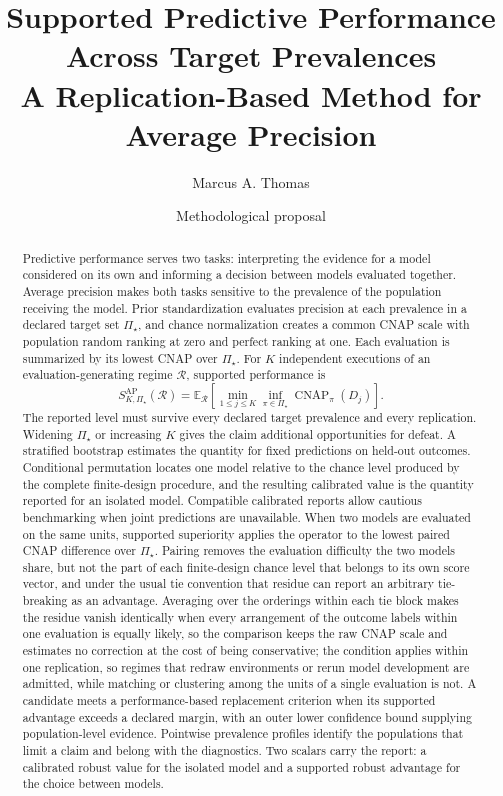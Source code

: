 \documentclass[11pt]{article}
\title{Supported Predictive Performance Across Target Prevalences\\
\large A Replication-Based Method for Average Precision}
\author{Marcus A. Thomas}
\date{Methodological proposal}
\newcommand{\CNAP}{\operatorname{CNAP}}
\newcommand{\Regime}{\mathcal{R}}
\newcommand{\PSet}{\Pi_\star}
\newcommand{\E}{\mathbb{E}}
\theoremstyle{remark}
\begin{document}
\maketitle

\begin{abstract}
Predictive performance serves two tasks: interpreting the evidence for a model considered on its own and informing a decision between models evaluated together. Average precision makes both tasks sensitive to the prevalence of the population receiving the model. Prior standardization evaluates precision at each prevalence in a declared target set $\PSet$, and chance normalization creates a common CNAP scale with population random ranking at zero and perfect ranking at one. Each evaluation is summarized by its lowest CNAP over $\PSet$. For $K$ independent executions of an evaluation-generating regime $\Regime$, supported performance is
\[
S_{K,\PSet}^{\mathrm{AP}}(\Regime)
=
\E_{\Regime}
\left[
\min_{1\leq j\leq K}
\inf_{\pi\in\PSet}\CNAP_\pi(D_j)
\right].
\]
The reported level must survive every declared target prevalence and every replication. Widening $\PSet$ or increasing $K$ gives the claim additional opportunities for defeat. A stratified bootstrap estimates the quantity for fixed predictions on held-out outcomes. Conditional permutation locates one model relative to the chance level produced by the complete finite-design procedure, and the resulting calibrated value is the quantity reported for an isolated model. Compatible calibrated reports allow cautious benchmarking when joint predictions are unavailable. When two models are evaluated on the same units, supported superiority applies the operator to the lowest paired CNAP difference over $\PSet$. Pairing removes the evaluation difficulty the two models share, but not the part of each finite-design chance level that belongs to its own score vector, and under the usual tie convention that residue can report an arbitrary tie-breaking as an advantage. Averaging over the orderings within each tie block makes the residue vanish identically when every arrangement of the outcome labels within one evaluation is equally likely, so the comparison keeps the raw CNAP scale and estimates no correction at the cost of being conservative; the condition applies within one replication, so regimes that redraw environments or rerun model development are admitted, while matching or clustering among the units of a single evaluation is not. A candidate meets a performance-based replacement criterion when its supported advantage exceeds a declared margin, with an outer lower confidence bound supplying population-level evidence. Pointwise prevalence profiles identify the populations that limit a claim and belong with the diagnostics. Two scalars carry the report: a calibrated robust value for the isolated model and a supported robust advantage for the choice between models.
\end{abstract}
\end{document}
